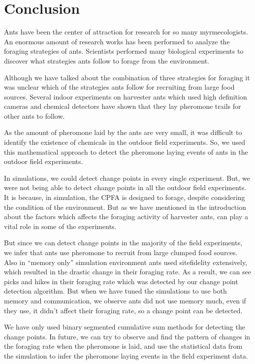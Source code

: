 \chapter{Conclusion}
Ants have been the center of attraction for research for so many myrmecologists. An enormous amount of research works has been performed to analyze the foraging strategies of ants. Scientists performed many biological experiments to discover what strategies ants follow to forage from the environment. \par
Although we have talked about the combination of three strategies for foraging it was unclear which of the strategies ants follow for recruiting from large food sources. Several indoor experiments on harvester ants which used high definition cameras and chemical detectors have shown that they lay pheromone trails for other ants to follow. \par
As the amount of pheromone laid by the ants are very small, it was difficult to identify the existence of chemicals in the outdoor field experiments. So, we used this mathematical approach to detect the pheromone laying events of ants in the outdoor field experiments. \par
In simulations, we could detect change points in every single experiment. But, we were not being able to detect change points in all the outdoor field experiments. It is because, in simulation, the CPFA is designed to forage, despite considering the condition of the environment. But as we have mentioned in the introduction about the factors which affects the foraging activity of harvester ants, can play a vital role in some of the experiments.\par
But since we can detect change points in the majority of the field experiments, we infer that ants use pheromone to recruit from large clumped food sources.
Also in ``memory only'' simulation environment ants used sitefidelity extensively, which resulted in the drastic change in their foraging rate. As a result, we can see picks and hikes in their foraging rate which was detected by our change point detection algorithm. But when we have tuned the simulations to use both memory and communication, we observe ants did not use memory much, even if they use, it didn’t affect their foraging rate, so a change point can be detected.\par
We have only used binary segmented cumulative sum methods for detecting the change points. In future, we can try to observe and find the pattern of changes in the foraging rate when the pheromone is laid, and use the statistical data from the simulation to infer the pheromone laying events in the field experiment data.
